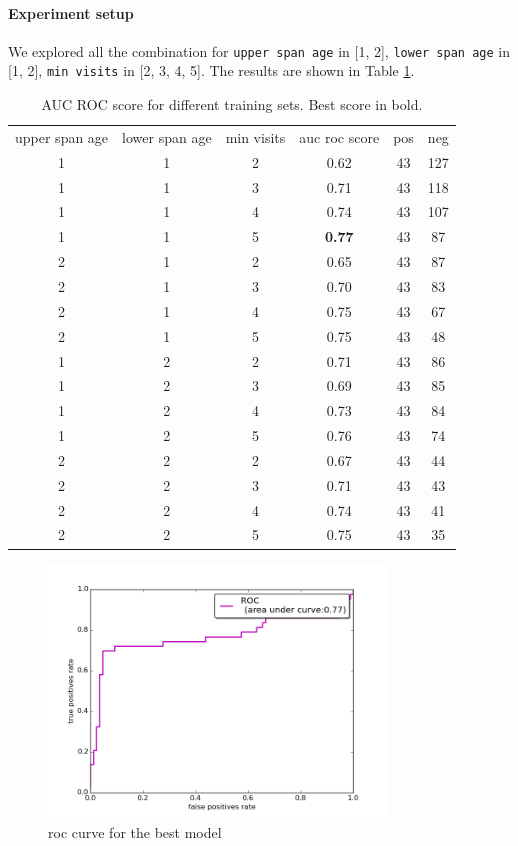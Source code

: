 \paragraph{Experiment setup}
We explored all the combination for \texttt{upper span age} in [1, 2], \texttt{lower span age} in [1, 2], \texttt{min visits} in [2, 3, 4, 5]. The results are shown in Table \ref{table:exp_res}.


\begin{table}[!h]
	\centering
	\begin{tabular}{c  c  c | c  c c}
		upper span age & lower span age & min visits & auc roc score & pos & neg\\
		1 & 1 & 2  & 0.62 & 43 & 127\\
		1 & 1 & 3  & 0.71 & 43 & 118\\
		1 & 1 & 4  & 0.74 & 43 & 107\\
		1 & 1 & 5  & \textbf{0.77} & 43 & 87\\
		2 & 1 & 2  & 0.65 & 43 & 87\\
		2 & 1 & 3  & 0.70 & 43 & 83\\
		2 & 1 & 4  & 0.75 & 43 & 67\\
		2 & 1 & 5  & 0.75 & 43 & 48\\
		1 & 2 & 2  & 0.71 & 43 & 86\\
		1 & 2 & 3  & 0.69 & 43 & 85\\
		1 & 2 & 4  & 0.73 & 43 & 84\\
		1 & 2 & 5  & 0.76 & 43 & 74\\
		2 & 2 & 2  & 0.67 & 43 & 44\\
		2 & 2 & 3  & 0.71 & 43 & 43\\
		2 & 2 & 4  & 0.74 & 43 & 41\\
		2 & 2 & 5  & 0.75 & 43 & 35\\
		
	\end{tabular}
	\caption{AUC ROC score for different training sets. Best score in bold.}
	\label{table:exp_res}
\end{table}


\begin{figure}[h]
	\centering
	\includegraphics[width= 0.8\textwidth]{chapter4/roc.png}
	\caption{roc curve for the best model}
	\label{fig:roc_best}
\end{figure}

